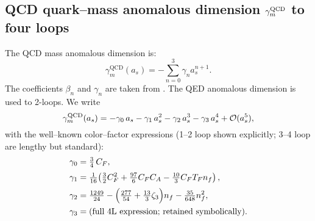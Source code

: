 \documentclass[aps,prd,onecolumn,amsmath,amssymb,superscriptaddress,nofootinbib,showpacs,showkeys]{revtex4-2}
\begin{document}
%
%
%

\subsection{ QCD quark–mass anomalous dimension \texorpdfstring{$\gamma_m^{\rm QCD}$}{gamma\_m(QCD)} to four loops}
The QCD mass anomalous dimension is:
\begin{equation}
\gamma_m^{\mathrm{QCD}}(a_s) = - \sum_{n=0}^{3} \gamma_n a_s^{n+1}.
\end{equation}
The coefficients $\beta_n$ and $\gamma_n$ are taken from \cite{vanRitbergenVermaserenLarin97, VermaserenLarinRitbergen97}. The QED anomalous dimension is used to 2-loops.
We write
\[
\gamma_m^{\rm QCD}(a_s) = -\gamma_0\,a_s - \gamma_1\,a_s^2 - \gamma_2\,a_s^3 - \gamma_3\,a_s^4 + \mathcal{O}(a_s^5),
\]
with the well–known color–factor expressions (1–2 loop shown explicitly; 3–4 loop are lengthy but standard):
\begin{align}
\gamma_0 &= \tfrac{3}{4}\,C_F,\\[2pt]
\gamma_1 &= \tfrac{1}{16}\!\left(\tfrac{3}{2}C_F^2 + \tfrac{97}{6} C_F C_A - \tfrac{10}{3} C_F T_F n_f\right),\\[2pt]
\gamma_2&=\tfrac{1249}{24}-\Bigl(\tfrac{277}{54}+\tfrac{13}{3}\zeta_3\Bigr)n_f-\tfrac{35}{648}n_f^2,\\
\gamma_3&=\text{(full 4L expression; retained symbolically)}.
\end{align}
\end{document}
